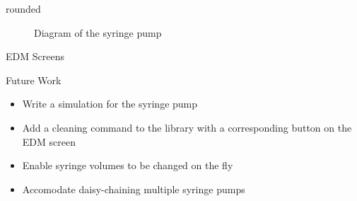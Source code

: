\documentclass[a0paper,landscape]{baposter}
\begin{document}
\begin{poster}
\begin{posterbox}[name=edmimage,column=3,headerfont={},headershape=rounded,boxheaderheight=0em,boxColorOne=white,borderColor=white]{rounded}
\begin{figure}[H]
\begin{center}
\caption{Diagram of the syringe pump}
\end{center}
\end{figure}
\end{posterbox}
\begin{posterbox}[name=edmscreenexp,column=3,below=edmimage]{EDM Screens}
\end{posterbox}

\begin{posterbox}[name=futurework,column=3,above=bottom]{Future Work}
 \begin{itemize}
    \item Write a simulation for the syringe pump 
    \item Add a cleaning command to the library with a corresponding button on the EDM screen 
    \item Enable syringe volumes to be changed on the fly 
    \item Accomodate daisy-chaining multiple syringe pumps 
\end{itemize}
\end{posterbox}

\end{poster}
\end{document}
